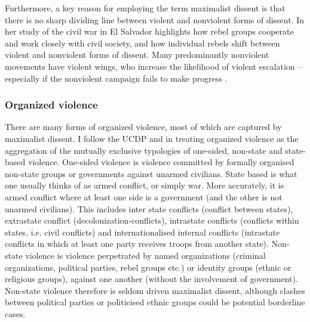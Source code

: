 \documentclass[12pt]{article}
\begin{document}
Furthermore, a key reason for employing the term maximalist dissent is that
there is no sharp dividing line between violent and nonviolent forms of dissent.
In her study of the civil war in El Salvador \citet{Wood2003} highlights how
rebel groups cooperate and work closely with civil society, and how individual
rebels shift between violent and nonviolent forms of dissent. Many predominantly
nonviolent movements have violent wings, who increase the likelihood of
violent escalation -- especially if the nonviolent campaign fails to make
progress \citep{Ryckman_2019}.

\subsubsection{Organized violence}
\label{Organized violence}

There are many forms of organized violence, most of which are captured by
maximalist dissent. I follow the UCDP and \citet{Melander_2016} in treating
organized violence as the aggregation of the mutually exclusive typologies of
one-sided, non-state and state-based violence. One-sided violence is violence
committed by formally organised non-state groups or governments against unarmed
civilians. State based is what one usually thinks of as armed conflict, or
simply war. More accurately, it is armed conflict where at least one side is a
government (and the other is not unarmed civilians). This includes inter state
conflicts (conflict between states), extrastate conflict
(decolonization-conflicts), intrastate conflicts (conflicts within states, i.e.
civil conflicts) and internationalised internal conflicts (intrastate conflicts
in which at least one party receives troops from another state). Non-state
violence is violence perpetrated by named organizations (criminal organizations,
political parties, rebel groups etc.) or identity groups (ethnic or religious
groups), against one another (without the involvement of government). Non-state
violence therefore is seldom driven maximalist dissent, although clashes between
political parties or politicised ethnic groups could be potential borderline
cases.
\end{document}
